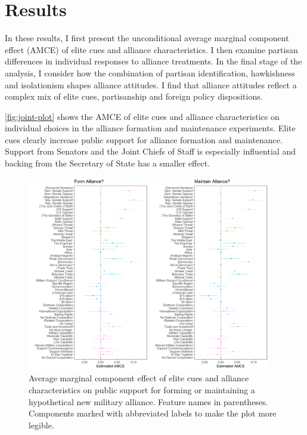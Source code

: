 \documentclass[12pt]{article}
\begin{document}


\section{Results} 


In these results, I first present the unconditional average marginal component effect (AMCE) of elite cues and alliance characteristics.
I then examine partisan differences in individual responses to alliance treatments. 
In the final stage of the analysis, I consider how the combination of partisan identification, hawkishness and isolationism shapes alliance attitudes. 
I find that alliance attitudes reflect a complex mix of elite cues, partisanship and foreign policy dispositions. 


\autoref{fig:joint-plot} shows the AMCE of elite cues and alliance characteristics on individual choices in the alliance formation and maintenance experiments.
Elite cues clearly increase public support for alliance formation and maintenance. 
Support from Senators and the Joint Chiefs of Staff is especially influential and backing from the Secretary of State has a smaller effect. 


\begin{figure}
	\centering
		\includegraphics[width=0.95\textwidth]{../figures/joint-amce-plots.png}
	\caption{Average marginal component effect of elite cues and alliance characteristics on public support for forming or maintaining a hypothetical new military alliance. Feature names in parentheses. Components marked with abbreviated labels to make the plot more legible.}
	\label{fig:joint-plot}
\end{figure}
\end{document}
